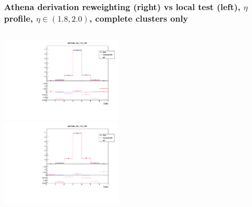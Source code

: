 \documentclass{beamer}
\begin{document}
\begin{frame}
\frametitle{Athena derivation reweighting (right) vs local test (left), $\eta$ profile, $\eta \in (1.8, 2.0)$, complete clusters only}

\begin{columns}[t]

\centering
\includegraphics[width=6cm]{etaProfile_Eta_18_20_Athena.pdf}\\
\centering
\includegraphics[width=6cm]{etaProfile_Rew_Eta_18_20_Local_Rew_noBS.pdf}\\
\end{columns}
\end{frame}
\end{document}
